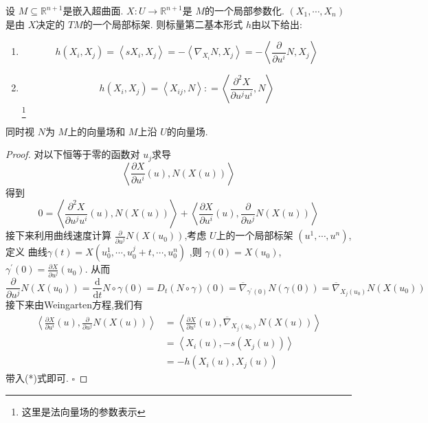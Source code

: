 \documentclass[../../几何与拓扑.tex]{subfiles}
\begin{document}
\begin{proposition}
    设 \(  M\subseteq \mathbb{R} ^{n+ 1}  \)是嵌入超曲面. \(  X:U\to \mathbb{R} ^{n+ 1}  \)是 \(  M  \)的一个局部参数化.   \(  \left(  X_1,\cdots,X_n  \right)   \)是由 \(  X  \)决定的 \(  TM  \)的一个局部标架.   则标量第二基本形式 \(  h  \)由以下给出: \begin{enumerate}
        \item \[
        h\left( X_{i},X_{j} \right)= \left<sX_{i},X_{j} \right>= - \left< \nabla _{X_{i}}N,X_{j} \right>= -\left<\frac{\partial }{\partial u^{i}}N,X_{j} \right> 
        \]
        \item \[
            h\left( X_{i},X_{j} \right)=  \left<X_{ij},N \right>: =  \left<\frac{\partial ^{2}X}{\partial u^{j}u^{i}},N \right>
        \] \footnote{这里是法向量场的参数表示}
    \end{enumerate}
   
\end{proposition}
\begin{remark}
    同时视 \(  N  \)为 \(  M  \)上的向量场和  \(  M  \)上沿 \(  U  \)的向量场.    
\end{remark}
\begin{proof}
    对以下恒等于零的函数对 \(  u_{j}  \)求导 \[
    \left<\frac{\partial X}{\partial u^{i}}\left( u \right) ,N\left( X\left( u \right)  \right)  \right>
    \] 
得到 \[
0 =  \left< \frac{\partial ^{2}X}{\partial u^{j}u^{i}}\left( u \right),N\left( X\left( u \right)  \right)  \right>+  \left<\frac{\partial X}{\partial u^{i}}\left( u \right),\frac{\partial }{\partial u^{j}} N\left( X\left( u \right)  \right)   \right> \tag{*}
\]接下来利用曲线速度计算  \(  \frac{\partial }{\partial u^{j}}N\left( X\left( u_0 \right)  \right)   \),考虑 \(  U  \)上的一个局部标架 \(  \left(  u^1,\cdots,u^n  \right)   \),定义 曲线\(   \gamma \left( t \right)= X\left( u_0^{1},\cdots ,u_0^{j}+ t,\cdots ,u_0^{n} \right)    \)    ,则 \(   \gamma \left( 0 \right)= X\left( u_0 \right)    \), \(   \gamma ^{\prime} \left( 0 \right)= \frac{\partial X}{\partial u^{j}}\left( u_0 \right)    \). 从而 \[
\frac{\partial }{\partial u^{j}}N\left( X\left( u_0 \right)  \right)=  \frac{\mathrm{d}}{\mathrm{d}t} N\circ  \gamma \left( 0\right) = D_{t}\left( N\circ  \gamma  \right)\left(0\right)= \overline{ \nabla } _{ \gamma ^{\prime} \left( 0 \right) }N\left(  \gamma \left( 0 \right)  \right)=    \overline{ \nabla }_{X_{j}\left( u_0 \right) }N\left( X\left( u_0 \right)  \right) 
\]  接下来由Weingarten方程,我们有 \[
\begin{aligned}
\left<\frac{\partial X}{\partial u^{i}}\left( u \right),\frac{\partial }{\partial u^{j}}N\left( X\left( u \right)  \right)   \right>&=  \left<\frac{\partial X}{\partial u^{i}}\left( u \right), \overline{ \nabla }_{X_{j}\left( u_0 \right) }N\left( X\left( u \right)  \right)   \right>\\ 
 &= \left<X_{i}\left( u \right),-s\left( X_{j}\left( u \right)  \right)    \right>\\ 
  &= -h \left( X_{i}\left( u \right),X_{j}\left( u \right)   \right) 
\end{aligned}
\]带入(*)式即可. 
    \hfill $\square$
\end{proof}
\end{document}
